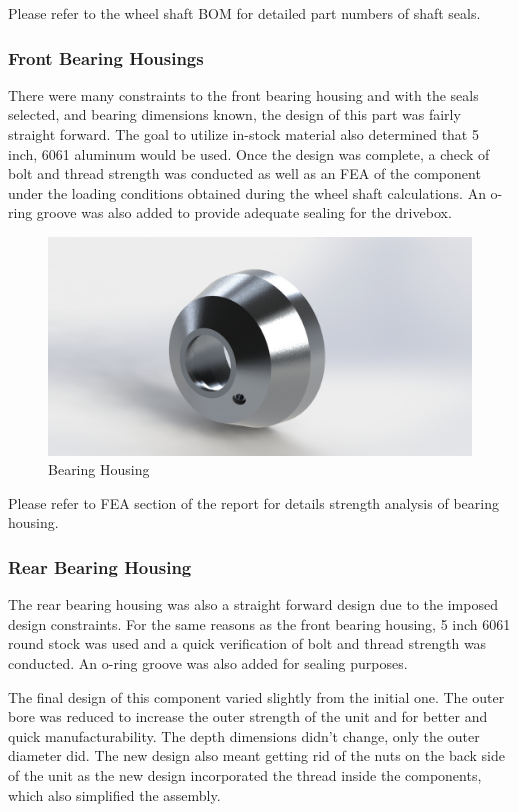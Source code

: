 Please refer to the wheel shaft BOM for detailed part numbers of shaft seals.

\subsubsection{Front Bearing Housings}
There were many constraints to the front bearing housing and with the seals selected, and bearing dimensions known, the design of this part was fairly straight forward. The goal to utilize in-stock material also determined that 5 inch, 6061 aluminum would be used. Once the design was complete, a check of bolt and thread strength was conducted as well as an FEA of the component under the loading conditions obtained during the wheel shaft calculations. An o-ring groove was also added to provide adequate sealing for the drivebox.

\begin{figure}[h]\centering
	\includegraphics[width=.7\linewidth]{dom/hub_iso_rndr.jpg}
	\caption{Bearing Housing}
	\label{fig:housing}
\end{figure}

Please refer to FEA section of the report for details strength analysis of bearing housing.

\subsubsection{Rear Bearing Housing}
The rear bearing housing was also a straight forward design due to the imposed design constraints. For the same reasons as the front bearing housing, 5 inch 6061 round stock was used and a quick verification of bolt and thread strength was conducted. An o-ring groove was also added for sealing purposes.

The final design of this component varied slightly from the initial one. The outer bore was reduced to increase the outer strength of the unit and for better and quick manufacturability. The depth dimensions didn't change, only the outer diameter did. The new design also meant getting rid of the nuts on the back side of the unit as the new design incorporated the thread inside the components, which also simplified the assembly.

